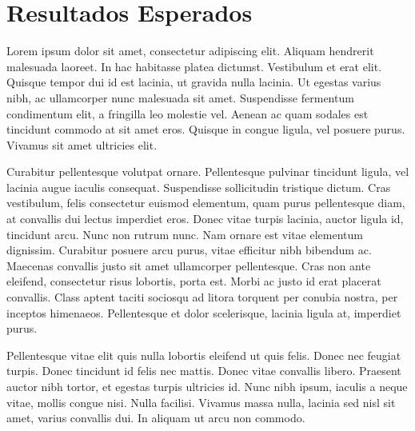 \chapter{Resultados Esperados}

Lorem ipsum dolor sit amet, consectetur adipiscing elit. Aliquam hendrerit malesuada laoreet. In hac habitasse platea dictumst. Vestibulum et erat elit. Quisque tempor dui id est lacinia, ut gravida nulla lacinia. Ut egestas varius nibh, ac ullamcorper nunc malesuada sit amet. Suspendisse fermentum condimentum elit, a fringilla leo molestie vel. Aenean ac quam sodales est tincidunt commodo at sit amet eros. Quisque in congue ligula, vel posuere purus. Vivamus sit amet ultricies elit.

Curabitur pellentesque volutpat ornare. Pellentesque pulvinar tincidunt ligula, vel lacinia augue iaculis consequat. Suspendisse sollicitudin tristique dictum. Cras vestibulum, felis consectetur euismod elementum, quam purus pellentesque diam, at convallis dui lectus imperdiet eros. Donec vitae turpis lacinia, auctor ligula id, tincidunt arcu. Nunc non rutrum nunc. Nam ornare est vitae elementum dignissim. Curabitur posuere arcu purus, vitae efficitur nibh bibendum ac. Maecenas convallis justo sit amet ullamcorper pellentesque. Cras non ante eleifend, consectetur risus lobortis, porta est. Morbi ac justo id erat placerat convallis. Class aptent taciti sociosqu ad litora torquent per conubia nostra, per inceptos himenaeos. Pellentesque et dolor scelerisque, lacinia ligula at, imperdiet purus.

Pellentesque vitae elit quis nulla lobortis eleifend ut quis felis. Donec nec feugiat turpis. Donec tincidunt id felis nec mattis. Donec vitae convallis libero. Praesent auctor nibh tortor, et egestas turpis ultricies id. Nunc nibh ipsum, iaculis a neque vitae, mollis congue nisi. Nulla facilisi. Vivamus massa nulla, lacinia sed nisl sit amet, varius convallis dui. In aliquam ut arcu non commodo.